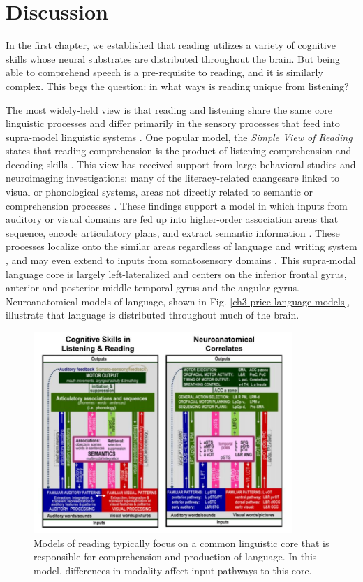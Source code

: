 \chapter{Discussion}

In the first chapter, we established that reading utilizes a variety of cognitive skills whose neural substrates are distributed throughout the brain. But being able to comprehend speech is a pre-requisite to reading, and it is similarly complex. This begs the question: in what ways is reading unique from listening?

The most widely-held view is that reading and listening share the same core linguistic processes and differ primarily in the sensory processes that feed into supra-model linguistic systems \citep{Mattingly1971, Price2012}. One popular model, the \textit{Simple View of Reading} states that reading comprehension is the product of listening comprehension and decoding skills \citep{Gough1986}. This view has received support from large behavioral studies \citep{Kirby2008} and neuroimaging investigations: many of the literacy-related changesare linked to visual or phonological systems, areas not directly related to semantic or comprehension processes \citep{Schlaggar2007, Dehaene2015}. These findings support a model in which inputs from auditory or visual domains are fed up into higher-order association areas that sequence, encode articulatory plans, and extract semantic information \citep{Price2012}. These processes localize onto the similar areas regardless of language and writing system \citep{Rueckl2016}, and may even extend to inputs from somatosensory domains \citep{Xu2005, Sood2016}. This supra-modal language core is largely left-lateralized and centers on the inferior frontal gyrus, anterior and posterior middle temporal gyrus and the angular gyrus. Neuroanatomical models of language, shown in Fig. \ref{ch3-price-language-models}, illustrate that language is distributed throughout much of the brain. 

\begin{figure}[t]
	\centering
	\includegraphics[height=3in]{images/ch3-price-language-models.jpg}
	\caption[Schematics of skills and brain areas used in reading.]{Models of reading typically focus on a common linguistic core that is responsible for comprehension and production of language. In this model, differences in modality affect input pathways to this core.}
	\label{fig:ch3-price-language-models}
\end{figure}


